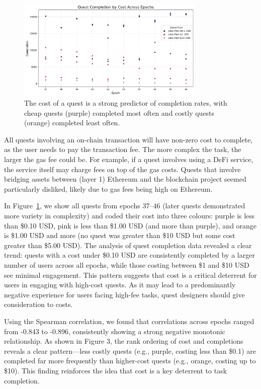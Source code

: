 \begin{figure}[t]
    \centering
    \includegraphics[width=0.8\textwidth]{figures/cost.png}
    \caption{The cost of a quest is a strong predictor of completion rates, with cheap quests (purple) completed most often and costly quests (orange) completed least often.\label{fig:cost}}
\end{figure}

All quests involving an on-chain transaction will have non-zero cost to complete, as the user needs to pay the transaction fee. The more complex the task, the larger the gas fee could be. For example, if a quest involves using a DeFi service, the service itself may charge fees on top of the gas costs. Quests that involve bridging assets between (layer 1) Ethereum and the blockchain project seemed particularly disliked, likely due to gas fees being high on Ethereum. 

In Figure~\ref{fig:cost}, we show all quests from epochs 37--46 (later quests demonstrated more variety in complexity) and coded their cost into three colours: purple is less than \$0.10 USD, pink is less than \$1.00 USD (and more than purple), and orange is \$1.00 USD and more (no quest was greater than \$10 USD but some cost greater than \$5.00 USD).  The analysis of quest completion data revealed a clear trend: quests with a cost under \$0.10 USD are consistently completed by a larger number of users across all epochs, while those costing between \$1 and \$10 USD see minimal engagement. This pattern suggests that cost is a critical deterrent for users in engaging with high-cost quests. As it may lead to a predominantly negative experience for users facing high-fee tasks, quest designers should give consideration to costs. 

Using the Spearman correlation, we found that correlations across epochs ranged 
from -0.843 to -0.896, consistently showing a strong negative monotonic relationship. As shown in Figure 3, 
the rank ordering of cost and completions reveals a clear pattern—less costly quests (e.g., purple, costing less than \$0.1) are completed far more frequently than higher-cost quests (e.g., orange, costing up to \$10). This finding reinforces the idea that cost is a key deterrent to task completion.

